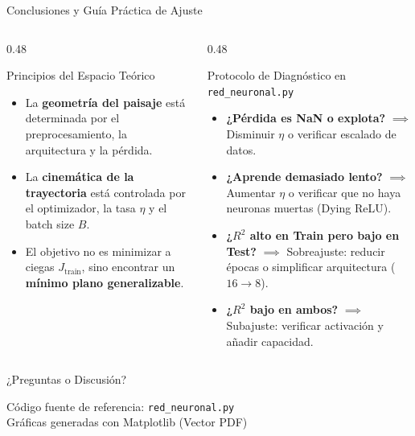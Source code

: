 \documentclass[10pt,aspectratio=169]{beamer}
\begin{document}
\begin{frame}{Conclusiones y Guía Práctica de Ajuste}
  \begin{columns}[T]
    \begin{column}{0.48\textwidth}
      \begin{block}{Principios del Espacio Teórico}
        \scriptsize
        \begin{itemize}
          \item La \textbf{geometría del paisaje} está determinada por el preprocesamiento, la arquitectura y la pérdida.
          \item La \textbf{cinemática de la trayectoria} está controlada por el optimizador, la tasa $\eta$ y el batch size $B$.
          \item El objetivo no es minimizar a ciegas $J_{\text{train}}$, sino encontrar un \textbf{mínimo plano generalizable}.
        \end{itemize}
      \end{block}
    \end{column}

    \begin{column}{0.48\textwidth}
      \begin{alertblock}{Protocolo de Diagnóstico en \texttt{red\_neuronal.py}}
        \scriptsize
        \begin{itemize}
          \item \textbf{¿Pérdida es NaN o explota?} $\implies$ Disminuir $\eta$ o verificar escalado de datos.
          \item \textbf{¿Aprende demasiado lento?} $\implies$ Aumentar $\eta$ o verificar que no haya neuronas muertas (Dying ReLU).
          \item \textbf{¿$R^2$ alto en Train pero bajo en Test?} $\implies$ Sobreajuste: reducir épocas o simplificar arquitectura ($16 \to 8$).
          \item \textbf{¿$R^2$ bajo en ambos?} $\implies$ Subajuste: verificar activación y añadir capacidad.
        \end{itemize}
      \end{alertblock}
    \end{column}
  \end{columns}
\end{frame}

\begin{frame}[standout]
  \Huge ¿Preguntas o Discusión?
  \vspace{0.4cm}

  \normalsize Código fuente de referencia: \texttt{red\_neuronal.py} \\
  Gráficas generadas con Matplotlib (Vector PDF)
\end{frame}
\end{document}
